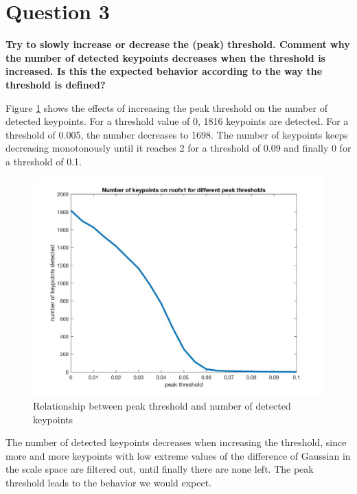 \section*{Question 3}

{\bfseries Try to slowly increase or decrease the (peak) threshold. Comment
why the number of detected keypoints decreases when the threshold is increased.
Is this the expected behavior according to the way the threshold is defined?}


Figure \ref{fig:n_peak_thresh} shows the effects of increasing the peak threshold on the number of detected keypoints. For a threshold value of 0, 1816 keypoints are detected. For a threshold of 0.005, the number decreases to 1698. The number of keypoints keeps decreasing monotonously until it reaches 2 for a threshold of 0.09 and finally 0 for a threshold of 0.1.
\begin{figure}[!hbt]
  \includegraphics[width=\textwidth]{img/n_peak_thresh}
  \caption{Relationship between peak threshold and number of detected keypoints}
  \label{fig:n_peak_thresh}
\end{figure}

The number of detected keypoints decreases when increasing the threshold, since more and more keypoints with low extreme values of the difference of Gaussian in the scale space are filtered out, until finally there are none left. The peak threshold leads to the behavior we would expect. 

